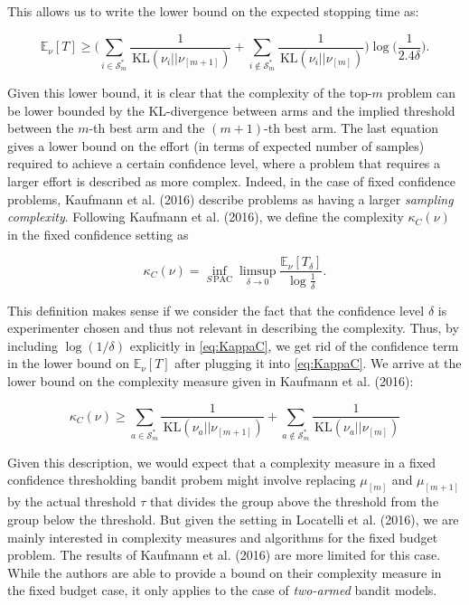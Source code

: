 \documentclass[11pt,]{article}
\newcommand{\KL}{\,\text{KL}}
\begin{document}
This allows us to write the lower bound on the expected stopping time
as:

\begin{equation*}
\mathbb{E}_{\nu}[T] \geq \Big( \sum_{i \in \mathcal{S}_m^*} \frac{1}{\KL(\nu_i|| \nu_{[m+1]})} + \sum_{i \notin \mathcal{S}_m^*} \frac{1}{\KL(\nu_i|| \nu_{[m]})} \Big) \log \big(\frac{1}{2.4\delta} \big).
\end{equation*}

Given this lower bound, it is clear that the complexity of the top-\(m\)
problem can be lower bounded by the KL-divergence between arms and the
implied threshold between the \(m\)-th best arm and the \((m+1)\)-th
best arm. The last equation gives a lower bound on the effort (in terms
of expected number of samples) required to achieve a certain confidence
level, where a problem that requires a larger effort is described as
more complex. Indeed, in the case of fixed confidence problems, Kaufmann
et al. (2016) describe problems as having a larger \emph{sampling
complexity}. Following Kaufmann et al. (2016), we define the complexity
\(\kappa_C(\nu)\) in the fixed confidence setting as

\begin{equation}
\kappa_C(\nu) = \inf_{S \, \text{PAC}} \limsup_{\delta \to 0} \frac{\mathbb{E}_{\nu}[T_{\delta}]}{\log \frac{1}{\delta}}. \label{eq:KappaC}
\end{equation}

This definition makes sense if we consider the fact that the confidence
level \(\delta\) is experimenter chosen and thus not relevant in
describing the complexity. Thus, by including \(\log(1/\delta)\)
explicitly in \eqref{eq:KappaC}, we get rid of the confidence term in
the lower bound on \(\mathbb{E}_{\nu}[T]\) after plugging it into
\eqref{eq:KappaC}. We arrive at the lower bound on the complexity
measure given in Kaufmann et al. (2016):

\begin{equation*}
\kappa_C(\nu) \geq \sum_{a \in \mathcal{S}_m^*} \frac{1}{\KL(\nu_a || \nu_{[m+1]})} + \sum_{a \notin \mathcal{S}_m^*} \frac{1}{\KL(\nu_a || \nu_{[m]})}
\end{equation*}

Given this description, we would expect that a complexity measure in a
fixed confidence thresholding bandit probem might involve replacing
\(\mu_{[m]}\) and \(\mu_{[m+1]}\) by the actual threshold \(\tau\) that
divides the group above the threshold from the group below the
threshold. But given the setting in Locatelli et al. (2016), we are
mainly interested in complexity measures and algorithms for the fixed
budget problem. The results of Kaufmann et al. (2016) are more limited
for this case. While the authors are able to provide a bound on their
complexity measure in the fixed budget case, it only applies to the case
of \emph{two-armed} bandit models.
\end{document}
